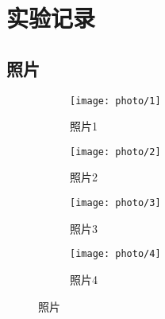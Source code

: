 \documentclass[../main]{subfiles}
\begin{document}
\chapter{实验记录}%
\label{cha:report}

\section{照片}%
\label{sec:photo}

\begin{figure}[htbp]
  \centering
  \begin{subfigure}[htbp]{0.45\linewidth}
    \centering
    \texttt{[image: photo/1]}
    \caption{照片1}%
    \label{fig:photo/1}
  \end{subfigure}
  \quad
  \begin{subfigure}[htbp]{0.45\linewidth}
    \centering
    \texttt{[image: photo/2]}
    \caption{照片2}%
    \label{fig:photo/2}
  \end{subfigure}

  \begin{subfigure}[htbp]{0.45\linewidth}
    \centering
    \texttt{[image: photo/3]}
    \caption{照片3}%
    \label{fig:photo/3}
  \end{subfigure}
  \quad
  \begin{subfigure}[htbp]{0.45\linewidth}
    \centering
    \texttt{[image: photo/4]}
    \caption{照片4}%
    \label{fig:photo/4}
  \end{subfigure}
  \caption{照片}%
  \label{fig:photo}
\end{figure}
\end{document}
